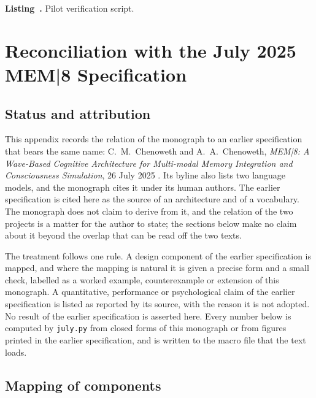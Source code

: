 \begin{small}
\begin{center}\textbf{Listing~\label{lst:pilot}\thelstcount.} Pilot verification script.\end{center}
\end{small}

\chapter{Reconciliation with the July 2025 MEM|8 Specification}\label{app:july}

\section*{Status and attribution}

This appendix records the relation of the monograph to an earlier specification that bears the same name: C.~M.~Chenoweth and A.~A.~Chenoweth, \emph{MEM|8: A Wave-Based Cognitive Architecture for Multi-modal Memory Integration and Consciousness Simulation}, 26 July 2025 \cite{chenoweth2025}. Its byline also lists two language models, and the monograph cites it under its human authors. The earlier specification is cited here as the source of an architecture and of a vocabulary. The monograph does not claim to derive from it, and the relation of the two projects is a matter for the author to state; the sections below make no claim about it beyond the overlap that can be read off the two texts.

The treatment follows one rule. A design component of the earlier specification is mapped, and where the mapping is natural it is given a precise form and a small check, labelled as a worked example, counterexample or extension of this monograph. A quantitative, performance or psychological claim of the earlier specification is listed as reported by its source, with the reason it is not adopted. No result of the earlier specification is asserted here. Every number below is computed by \texttt{july.py} from closed forms of this monograph or from figures printed in the earlier specification, and is written to the macro file that the text loads.

\section{Mapping of components}

